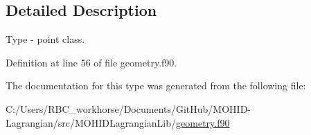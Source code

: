 \subsection{Detailed Description}
Type -\/ point class. 

Definition at line 56 of file geometry.\+f90.



The documentation for this type was generated from the following file\+:\begin{DoxyCompactItemize}
\item 
C\+:/\+Users/\+R\+B\+C\+\_\+workhorse/\+Documents/\+Git\+Hub/\+M\+O\+H\+I\+D-\/\+Lagrangian/src/\+M\+O\+H\+I\+D\+Lagrangian\+Lib/\mbox{\hyperlink{geometry_8f90}{geometry.\+f90}}\end{DoxyCompactItemize}
